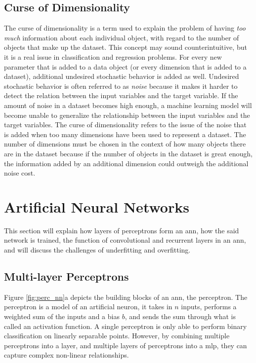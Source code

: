 \subsection{Curse of Dimensionality} \label{sec:curse_dimensionality}
The curse of dimensionality is a term used to explain the problem of having \textit{too much} information about each individual object, with regard to the number of objects that make up the dataset. This concept may sound counterintuitive, but it is a real issue in classification and regression problems. For every new parameter that is added to a data object (or every dimension that is added to a dataset), additional undesired stochastic behavior is added as well. Undesired stochastic behavior is often referred to as \textit{noise} because it makes it harder to detect the relation between the input variables and the target variable. If the amount of noise in a dataset becomes high enough, a machine learning model will become unable to generalize the relationship between the input variables and the target variables. The curse of dimensionality refers to the issue of the noise that is added when too many dimensions have been used to represent a dataset. The number of dimensions must be chosen in the context of how many objects there are in the dataset because if the number of objects in the dataset is great enough, the information added by an additional dimension could outweigh the additional noise cost.

\clearpage

\section{Artificial Neural Networks} \label{sec:ann}

This section will explain how layers of perceptrons form an \acrfull{ann}, how the said network is trained, the function of convolutional and recurrent layers in an \acrshort{ann}, and will discuss the challenges of underfitting and overfitting.

\subsection{Multi-layer Perceptrons} \label{sec:mlp}
Figure \ref{fig:perc_nn}a depicts the building blocks of an \acrshort{ann}, the perceptron. 
The perceptron is a model of an artificial neuron, it takes in $n$ inputs, performs a weighted sum of the inputs and a bias $b$, and sends the sum through what is called an activation function. A single perceptron is only able to perform binary classification on linearly separable points. However, by combining multiple perceptrons into a layer, and multiple layers of perceptrons into a \acrfull{mlp}, they can capture complex non-linear relationships. 

